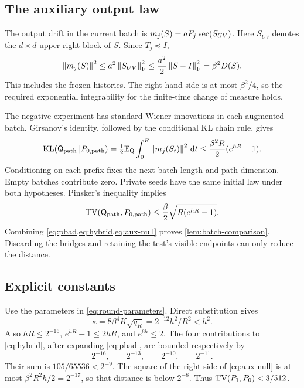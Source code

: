 \subsection{The auxiliary output law}

The output drift in the current batch is
$m_j(S)=aF_j\operatorname{vec}(S_{UV})$.
Here $S_{UV}$ denotes the $d\times d$ upper-right block of $S$. Since $T_j\preceq I$,
\begin{equation}
 \left\lVert m_j(S)\right\rVert^2
 \le a^2\left\lVert S_{UV}\right\rVert_{\mathrm F}^2
 \le\frac{a^2}{2}\left\lVert S-I\right\rVert_{\mathrm F}^2
 =\beta^2D(S).
 \label{eq:cross-block-drift}
\end{equation}
This includes the frozen histories. The right-hand side is at most $\beta^2/4$, so the required exponential integrability for the finite-time change of measure holds.

The negative experiment has standard Wiener innovations in each augmented batch. Girsanov's identity, followed by the conditional KL chain rule, gives
\[
 \operatorname{KL}(\mathsf Q_{\mathrm{path}}\Vert P_{0,\mathrm{path}})
 =\tfrac12\mathbb E_{\mathsf Q}\int_0^R\left\lVert m_j(S_t)\right\rVert^2\,\mathrm d t
 \le\frac{\beta^2R}{2}(e^{hR}-1).
\]
Conditioning on each prefix fixes the next batch length and path dimension. Empty batches contribute zero. Private seeds have the same initial law under both hypotheses. Pinsker's inequality implies
\begin{equation}
 \operatorname{TV}(\mathsf Q_{\mathrm{path}},P_{0,\mathrm{path}})
 \le\frac{\beta}{2}\sqrt{R(e^{hR}-1)}.
 \label{eq:aux-null}
\end{equation}
Combining \cref{eq:pbad,eq:hybrid,eq:aux-null} proves
\cref{lem:batch-comparison}. Discarding the bridges and retaining the test's visible endpoints can only reduce the distance.

\subsection{Explicit constants}
\label{app:round-constants}

Use the parameters in \cref{eq:round-parameters}. Direct substitution gives
\[
 \bar\kappa
 =8\beta^4K\sqrt{q_R}
 =2^{-12}h^2/R^2<h^2.
\]
Also $hR\le2^{-16}$, $e^{hR}-1\le2hR$, and $e^{6h}\le2$.
The four contributions to \cref{eq:hybrid}, after expanding
\cref{eq:pbad}, are bounded respectively by
\[
 2^{-16},\qquad 2^{-13},\qquad 2^{-10},\qquad 2^{-11}.
\]
Their sum is $105/65536<2^{-9}$.
The square of the right side of \cref{eq:aux-null} is at most
$\beta^2R^2h/2=2^{-17}$, so that distance is below $2^{-8}$.
Thus $\operatorname{TV}(P_1,P_0)<3/512$.

